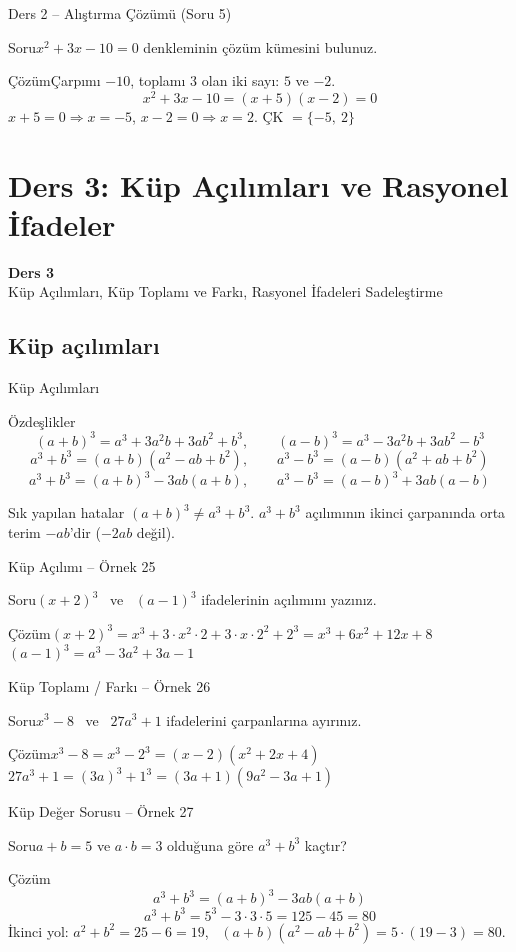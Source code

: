 \documentclass[aspectratio=169,11pt,handout]{beamer}
\newcommand{\soru}[3]{%
\begin{frame}{#1}
  \begin{block}{Soru}\large #2\end{block}
  \pause
  \begin{exampleblock}{Çözüm}\large #3\end{exampleblock}
\end{frame}}
\begin{document}
\soru{Ders 2 -- Alıştırma Çözümü (Soru 5)}
{\(x^2+3x-10=0\) denkleminin çözüm kümesini bulunuz.}
{Çarpımı \(-10\), toplamı \(3\) olan iki sayı: \(5\) ve \(-2\).
\[x^2+3x-10=(x+5)(x-2)=0\]
\(x+5=0\Rightarrow x=-5\), \quad \(x-2=0\Rightarrow x=2\). \quad ÇK \(=\{-5,\ 2\}\)}


\section{Ders 3: Küp Açılımları ve Rasyonel İfadeler}
\begin{frame}
\centering\Large\color{anamavi}\textbf{Ders 3}\\[6pt]\normalsize Küp Açılımları, Küp Toplamı ve Farkı, Rasyonel İfadeleri Sadeleştirme
\end{frame}

\subsection{Küp açılımları}
\begin{frame}{Küp Açılımları}
\begin{block}{Özdeşlikler}
\[(a+b)^3=a^3+3a^2b+3ab^2+b^3,\qquad (a-b)^3=a^3-3a^2b+3ab^2-b^3\]
\[a^3+b^3=(a+b)(a^2-ab+b^2),\qquad a^3-b^3=(a-b)(a^2+ab+b^2)\]
\[a^3+b^3=(a+b)^3-3ab(a+b),\qquad a^3-b^3=(a-b)^3+3ab(a-b)\]
\end{block}
\begin{alertblock}{Sık yapılan hatalar}
\((a+b)^3\neq a^3+b^3\). \quad \(a^3+b^3\) açılımının ikinci çarpanında orta terim \(-ab\)'dir (\(-2ab\) değil).
\end{alertblock}
\end{frame}

\soru{Küp Açılımı -- Örnek 25}
{\((x+2)^3\) \ ve \ \((a-1)^3\) ifadelerinin açılımını yazınız.}
{\((x+2)^3=x^3+3\cdot x^2\cdot 2+3\cdot x\cdot 2^2+2^3=x^3+6x^2+12x+8\)\\[4pt]
\((a-1)^3=a^3-3a^2+3a-1\)}

\soru{Küp Toplamı / Farkı -- Örnek 26}
{\(x^3-8\) \ ve \ \(27a^3+1\) ifadelerini çarpanlarına ayırınız.}
{\(x^3-8=x^3-2^3=(x-2)(x^2+2x+4)\)\\[4pt]
\(27a^3+1=(3a)^3+1^3=(3a+1)(9a^2-3a+1)\)}

\soru{Küp Değer Sorusu -- Örnek 27}
{\(a+b=5\) ve \(a\cdot b=3\) olduğuna göre \(a^3+b^3\) kaçtır?}
{\[a^3+b^3=(a+b)^3-3ab(a+b)\]
\[a^3+b^3=5^3-3\cdot 3\cdot 5=125-45=80\]
İkinci yol: \(a^2+b^2=25-6=19\), \ \((a+b)(a^2-ab+b^2)=5\cdot(19-3)=80\).}
\end{document}
